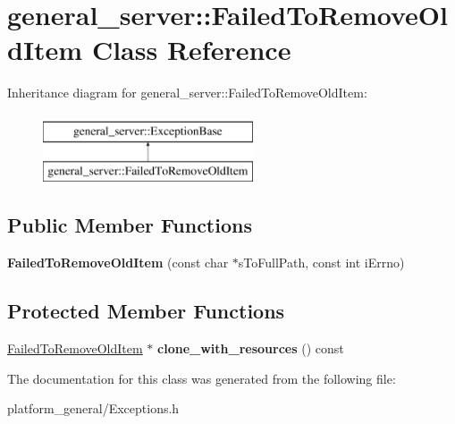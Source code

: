 \hypertarget{classgeneral__server_1_1FailedToRemoveOldItem}{\section{general\-\_\-server\-:\-:\-Failed\-To\-Remove\-Old\-Item \-Class \-Reference}
\label{classgeneral__server_1_1FailedToRemoveOldItem}
}
\-Inheritance diagram for general\-\_\-server\-:\-:\-Failed\-To\-Remove\-Old\-Item\-:\begin{figure}[H]
\begin{center}
\leavevmode
\includegraphics[height=2.000000cm]{classgeneral__server_1_1FailedToRemoveOldItem}
\end{center}
\end{figure}
\subsection*{\-Public \-Member \-Functions}
\begin{DoxyCompactItemize}
\item 
\hypertarget{classgeneral__server_1_1FailedToRemoveOldItem_a3746b458128fbc1215def8e4d54dff36}{{\bfseries \-Failed\-To\-Remove\-Old\-Item} (const char $\ast$s\-To\-Full\-Path, const int i\-Errno)}\label{classgeneral__server_1_1FailedToRemoveOldItem_a3746b458128fbc1215def8e4d54dff36}

\end{DoxyCompactItemize}
\subsection*{\-Protected \-Member \-Functions}
\begin{DoxyCompactItemize}
\item 
\hypertarget{classgeneral__server_1_1FailedToRemoveOldItem_a2b5c5416c711ef2abeb1612a301c7c16}{\hyperlink{classgeneral__server_1_1FailedToRemoveOldItem}{\-Failed\-To\-Remove\-Old\-Item} $\ast$ {\bfseries clone\-\_\-with\-\_\-resources} () const }\label{classgeneral__server_1_1FailedToRemoveOldItem_a2b5c5416c711ef2abeb1612a301c7c16}

\end{DoxyCompactItemize}


\-The documentation for this class was generated from the following file\-:\begin{DoxyCompactItemize}
\item 
platform\-\_\-general/\-Exceptions.\-h\end{DoxyCompactItemize}
